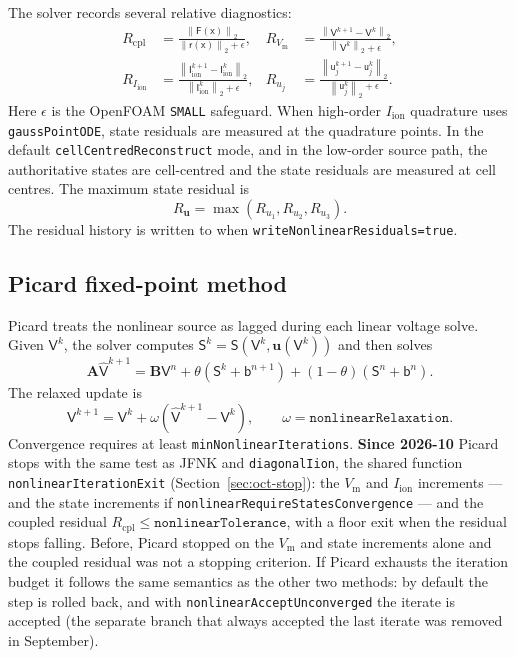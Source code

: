 \documentclass[11pt,a4paper]{article}
\newcommand{\code}[1]{\texttt{\small #1}}
\newcommand{\Vm}{V_{\text{m}}}
\newcommand{\Iion}{I_{\mathrm{ion}}}
\newcommand{\Aimp}{\mathbf{A}}
\newcommand{\Bimp}{\mathbf{B}}
\newcommand{\Fres}{\mathsf{F}}
\newcommand{\norm}[1]{\left\lVert #1 \right\rVert}
\begin{document}
The solver records several relative diagnostics:
\begin{align}
  R_{\mathrm{cpl}} &=
  \frac{\norm{\Fres(\mathsf{x})}_2}
       {\norm{\mathsf{r}(\mathsf{x})}_2+\epsilon},
  &
  R_{\Vm} &=
  \frac{\norm{\mathsf{V}^{k+1}-\mathsf{V}^{k}}_2}
       {\norm{\mathsf{V}^{k}}_2+\epsilon},\\
  R_{\Iion} &=
  \frac{\norm{\mathsf{I}^{k+1}_{\mathrm{ion}}-\mathsf{I}^{k}_{\mathrm{ion}}}_2}
       {\norm{\mathsf{I}^{k}_{\mathrm{ion}}}_2+\epsilon},
  &
  R_{u_j} &=
  \frac{\norm{\mathsf{u}^{k+1}_{j}-\mathsf{u}^{k}_{j}}_2}
       {\norm{\mathsf{u}^{k}_{j}}_2+\epsilon}.
\end{align}
Here $\epsilon$ is the OpenFOAM \code{SMALL} safeguard. When high-order
$\Iion$ quadrature uses \code{gaussPointODE}, state residuals are measured at
the quadrature points. In the default \code{cellCentredReconstruct} mode, and
in the low-order source path, the authoritative states are cell-centred and
the state residuals are measured at cell centres. The maximum state residual
is
\begin{equation}
  R_{\mathbf{u}}=\max(R_{u_1},R_{u_2},R_{u_3}).
\end{equation}
The residual history is written to
when \code{writeNonlinearResiduals=true}.

\subsection{Picard fixed-point method}
\label{sec:picard}

Picard treats the nonlinear source as lagged during each linear voltage solve.
Given $\mathsf{V}^{k}$, the solver computes
$\mathsf{S}^{k}=\mathsf{S}(\mathsf{V}^{k},\mathbf{u}(\mathsf{V}^{k}))$ and then
solves
\begin{equation}
  \Aimp \widehat{\mathsf{V}}^{k+1}
  =
  \Bimp\mathsf{V}^{n}
  +\theta(\mathsf{S}^{k}+\mathsf{b}^{n+1})
  +(1-\theta)(\mathsf{S}^{n}+\mathsf{b}^{n}).
\end{equation}
The relaxed update is
\begin{equation}
  \mathsf{V}^{k+1}
  =
  \mathsf{V}^{k}
  +
  \omega\left(\widehat{\mathsf{V}}^{k+1}-\mathsf{V}^{k}\right),
  \qquad
  \omega=\texttt{nonlinearRelaxation}.
\end{equation}
Convergence requires at least \code{minNonlinearIterations}. \textbf{Since
2026-10} Picard stops with the same test as JFNK and \code{diagonalIion}, the
shared function \code{nonlinearIterationExit} (Section~\ref{sec:oct-stop}): the
$\Vm$ and $\Iion$ increments --- and the state increments if
\code{nonlinearRequireStatesConvergence} --- and the coupled residual
$R_{\mathrm{cpl}}\le\texttt{nonlinearTolerance}$, with a floor exit when the
residual stops falling. Before, Picard stopped on the $\Vm$ and state increments
alone and the coupled residual was not a stopping criterion. If Picard exhausts
the iteration budget it follows the same semantics as the other two methods: by
default the step is rolled back, and with \code{nonlinearAcceptUnconverged} the
iterate is accepted (the separate branch that always accepted the last iterate
was removed in September).
\end{document}

